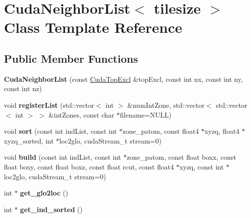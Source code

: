 \hypertarget{classCudaNeighborList}{}\section{Cuda\+Neighbor\+List$<$ tilesize $>$ Class Template Reference}
\label{classCudaNeighborList}
\subsection*{Public Member Functions}
\begin{DoxyCompactItemize}
\item 
\hypertarget{classCudaNeighborList_a195cb796422518b661ac7d1c08fb14a2}{}\label{classCudaNeighborList_a195cb796422518b661ac7d1c08fb14a2} 
{\bfseries Cuda\+Neighbor\+List} (const \hyperlink{classCudaTopExcl}{Cuda\+Top\+Excl} \&top\+Excl, const int nx, const int ny, const int nz)
\item 
\hypertarget{classCudaNeighborList_a9c3f22487d9ccc310a7423d84e9761a1}{}\label{classCudaNeighborList_a9c3f22487d9ccc310a7423d84e9761a1} 
void {\bfseries register\+List} (std\+::vector$<$ int $>$ \&num\+Int\+Zone, std\+::vector$<$ std\+::vector$<$ int $>$ $>$ \&int\+Zones, const char $\ast$filename=N\+U\+LL)
\item 
\hypertarget{classCudaNeighborList_afa5fef8705b03909572827b528c90672}{}\label{classCudaNeighborList_afa5fef8705b03909572827b528c90672} 
void {\bfseries sort} (const int ind\+List, const int $\ast$zone\+\_\+patom, const float4 $\ast$xyzq, float4 $\ast$xyzq\+\_\+sorted, int $\ast$loc2glo, cuda\+Stream\+\_\+t stream=0)
\item 
\hypertarget{classCudaNeighborList_afe2e41c8aa957a87b2ecfb06e586a266}{}\label{classCudaNeighborList_afe2e41c8aa957a87b2ecfb06e586a266} 
void {\bfseries build} (const int ind\+List, const int $\ast$zone\+\_\+patom, const float boxx, const float boxy, const float boxz, const float rcut, const float4 $\ast$xyzq, const int $\ast$loc2glo, cuda\+Stream\+\_\+t stream=0)
\item 
\hypertarget{classCudaNeighborList_ad178c1accd50c60a1df81fbb9b81ec1f}{}\label{classCudaNeighborList_ad178c1accd50c60a1df81fbb9b81ec1f} 
int $\ast$ {\bfseries get\+\_\+glo2loc} ()
\item 
\hypertarget{classCudaNeighborList_a96b7d2f83fa52799f79b83df80f75e39}{}\label{classCudaNeighborList_a96b7d2f83fa52799f79b83df80f75e39} 
int $\ast$ {\bfseries get\+\_\+ind\+\_\+sorted} ()
\item 

\end{DoxyCompactItemize}
